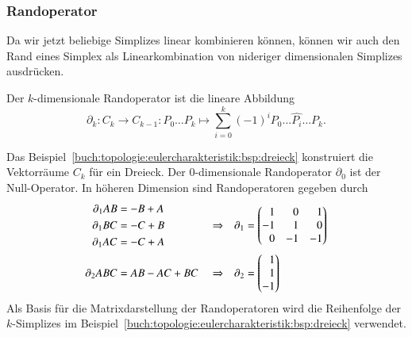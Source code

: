 %
%
\subsubsection{Randoperator}
Da wir jetzt beliebige Simplizes linear kombinieren können, können
wir auch den Rand eines Simplex als Linearkombination von nideriger
dimensionalen Simplizes ausdrücken.

\begin{definition}[Randoperator]
Der $k$-dimensionale Randoperator ist die lineare Abbildung
\[
\partial_k
\colon
C_k \to C_{k-1}
:
P_0\dots P_k
\mapsto
\sum_{i=0}^k
(-1)^i
P_0\dots\widehat{P_i}\dots P_k.
\]
%
\end{definition}

\begin{beispiel}
\label{buch:topologie:eulercharakteristik:bsp:dreieckrand}
Das Beispiel~\ref{buch:topologie:eulercharakteristik:bsp:dreieck}
konstruiert die Vektorräume $C_k$ für ein Dreieck.
%
Der $0$-dimensionale Randoperator $\partial_0$ ist der Null-Operator.
In höheren Dimension sind Randoperatoren gegeben durch
\begin{align*}
\partial_1 AB &= -B + A &&&&\\
\partial_1 BC &= -C + B &
&\Rightarrow
&\partial_1&=\smash{\begin{pmatrix*}[r]
 1 &  0 &  1 \\
-1 &  1 &  0 \\
 0 & -1 & -1
\end{pmatrix*}}
\\
\partial_1 AC &= -C + A \\
\partial_2 ABC &= AB - AC + BC&&\Rightarrow&\partial_2&=\begin{pmatrix*}[r]1\\1\\-1\end{pmatrix*}
\end{align*}
Als Basis für die Matrixdarstellung der Randoperatoren wird die
Reihenfolge der $k$-Simplizes im
Beispiel~\ref{buch:topologie:eulercharakteristik:bsp:dreieck}
verwendet.


\end{beispiel}
